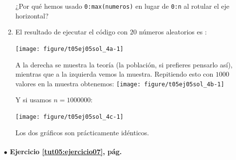 \documentclass[10pt,a4paper]{article}\usepackage[]{graphicx}\usepackage[]{color}
\newenvironment{knitrout}{}{} %
\begin{document}
\begin{enumerate}
\begin{knitrout}
\end{knitrout}
      ¿Por qué hemos usado {\tt 0:max(numeros)} en lugar de {\tt 0:n} al rotular el eje horizontal?

  \item El resultado de ejecutar el código con $20$ números aleatorios es :

\begin{knitrout}
\color{fgcolor}
\texttt{[image: figure/t05ej05sol\_4a-1]} 

\end{knitrout}
        A la derecha se muestra la teoría (la población, si prefieres pensarlo así), mientras que a la izquierda vemos la muestra. Repitiendo esto con $1000$ valores en la muestra obtenemos:
\begin{knitrout}
\color{fgcolor}
\texttt{[image: figure/t05ej05sol\_4b-1]} 

\end{knitrout}
        Y si usamos $n=1000000$:

\begin{knitrout}
\color{fgcolor}
\texttt{[image: figure/t05ej05sol\_4c-1]} 

\end{knitrout}

    Los dos gráficos son prácticamente idénticos.
\end{enumerate}

\paragraph{\bf $\bullet$ Ejercicio \ref{tut05:ejercicio07}, pág. \pageref{tut05:ejercicio07}}
\label{tut05:ejercicio07:sol}\quad\\
\end{document}
